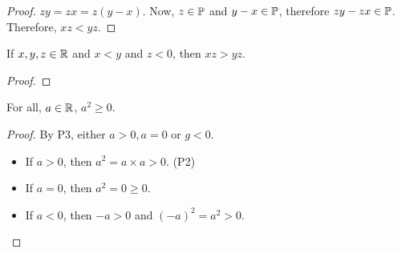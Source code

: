 \documentclass[11pt]{article}
\begin{document}
\begin{proof}
    \(zy = zx = z(y - x) \). Now, \(z \in \mathbb P\) and \(y - x \in \mathbb P\), therefore \(zy - zx \in \mathbb P\). Therefore, \(xz < yz\).
\end{proof}
\begin{corollary}
    If \(x, y, z \in \mathbb R\) and \(x < y\) and \(z < 0\), then \(xz > yz\).
\end{corollary}
\begin{proof}

\end{proof}
\begin{corollary}
    For all, \(a \in \mathbb R\), \(a^2 \geq 0\).
\end{corollary}
\begin{proof}
    By P3, either \(a > 0, a = 0\) or \(g < 0\).
    \begin{itemize}
        \item If \(a > 0\), then \(a^2 = a \times a > 0\). \hfill(P2)
        \item If \(a = 0\), then \(a^2 = 0 \geq 0\).
        \item If \(a < 0\), then \(-a > 0\) and \((-a)^2 = a^2 > 0\).
    \end{itemize}
\end{proof}
\end{document}
